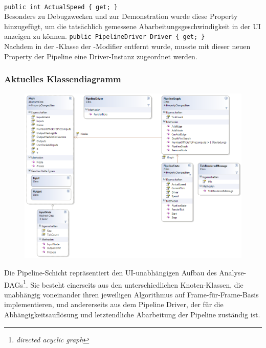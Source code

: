 \paragraph{}
\begin{itemize}
	\add \verb!public int ActualSpeed { get; }! \\
	Besonders zu Debugzwecken und zur Demonstration wurde diese Property hinzugefügt, um die tatsächlich gemessene Abarbeitungsgeschwindigkeit in der UI anzeigen zu können.
	\add \verb!public PipelineDriver Driver { get; }! \\
	Nachdem in der -Klasse der -Modifier entfernt wurde, musste mit dieser neuen Property der Pipeline eine Driver-Instanz zugeordnet werden.
\end{itemize}
\newpage

\subsubsection*{Aktuelles Klassendiagramm}
\begin{figure}[h!]
\begin{center}
\includegraphics[width=\textwidth]{classdiagram/pipe.png}
\end{center}
\end{figure}
Die Pipeline-Schicht repräsentiert den UI-unabhängigen Aufbau des Analyse-DAGs\footnote{\emph{directed acyclic graph}}. Sie besteht einerseits aus den unterschiedlichen Knoten-Klassen, die unabhängig voneinander ihren jeweiligen Algorithmus auf Frame-für-Frame-Basis implementieren, und andererseits aus dem Pipeline Driver, der für die Abhängigkeitsauflösung und letztendliche Abarbeitung der Pipeline zuständig ist.
\newpage

